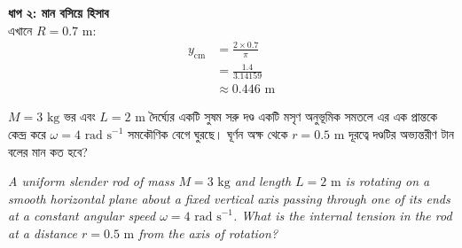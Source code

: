 \documentclass[12pt, a4paper]{article}
\begin{document}
{{\begin{tcolorbox}[solutionbox={সমাধান (Solution)}]
    \vspace{0.5em}
    \noindent\textbf{ধাপ ২: মান বসিয়ে হিসাব} \\
    এখানে $R = 0.7\text{ m}$:
    \begin{align*}
        y_{\text{cm}} &= \frac{2 \times 0.7}{\pi} \\
          &= \frac{1.4}{3.14159} \\
          &\approx \mathbf{0.446}\text{ m}
    \end{align*}
\end{tcolorbox}
\newpage

\begin{tcolorbox}[questionbox={প্রশ্ন (Question) 31}]
    \noindent
    $M = 3\text{ kg}$ ভর এবং $L = 2\text{ m}$ দৈর্ঘ্যের একটি সুষম সরু দণ্ড একটি মসৃণ অনুভূমিক সমতলে এর এক প্রান্তকে কেন্দ্র করে $\omega = 4\text{ rad s}^{-1}$ সমকৌণিক বেগে ঘুরছে। ঘূর্ণন অক্ষ থেকে $r = 0.5\text{ m}$ দূরত্বে দণ্ডটির অভ্যন্তরীণ টান বলের মান কত হবে?
    
    \vspace{0.8em}
    \begin{english}
    \noindent\textit{\color{darkgray}
    A uniform slender rod of mass $M = 3\text{ kg}$ and length $L = 2\text{ m}$ is rotating on a smooth horizontal plane about a fixed vertical axis passing through one of its ends at a constant angular speed $\omega = 4\text{ rad s}^{-1}$. What is the internal tension in the rod at a distance $r = 0.5\text{ m}$ from the axis of rotation?
    }
    \end{english}
\end{tcolorbox}

\vspace{1.5em}
\begin{center}
\end{center}}}
\end{document}
